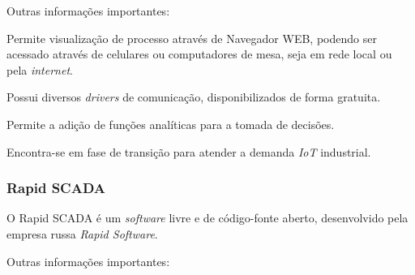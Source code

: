     Outras informações importantes:
    
    \begin{alineascomponto}
	    \item Permite visualização de processo através de Navegador \gls{WEB}, podendo ser acessado através de celulares ou computadores de mesa, seja em rede local ou pela \textit{internet}.
    	\item Possui diversos \textit{drivers} de comunicação, disponibilizados de forma gratuita.
    	\item Permite a adição de funções analíticas para a tomada de decisões.
    	\item Encontra-se em fase de transição para atender a demanda \textit{IoT} industrial.
    \end{alineascomponto}
    
\subsubsection{Rapid SCADA}
\label{sec:rapidscada}

    O Rapid SCADA \cite{RapidSCADA} é um \textit{software} livre e de código-fonte aberto, desenvolvido pela empresa russa \textit{Rapid Software}.

    \begin{figure}[!h]
    \end{figure}
    
    Outras informações importantes:
    

